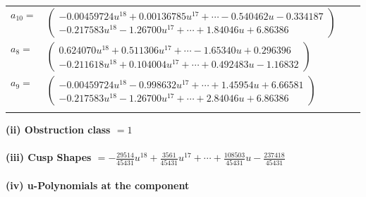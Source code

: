 \documentclass[1p]{elsarticle_modified}
\theoremstyle{definition}
\begin{document}
\begin{tabular}{m{7pt} m{180pt} m{7pt} m{180pt} }
\flushright $a_{10}=$&$\begin{pmatrix}-0.00459724 u^{18}+0.00136785 u^{17}+\cdots-0.540462 u-0.334187\\-0.217583 u^{18}-1.26700 u^{17}+\cdots+1.84046 u+6.86386\end{pmatrix}$ \\
\flushright $a_{8}=$&$\begin{pmatrix}0.624070 u^{18}+0.511306 u^{17}+\cdots-1.65340 u+0.296396\\-0.211618 u^{18}+0.104004 u^{17}+\cdots+0.492483 u-1.16832\end{pmatrix}$ \\
\flushright $a_{9}=$&$\begin{pmatrix}-0.00459724 u^{18}-0.998632 u^{17}+\cdots+1.45954 u+6.66581\\-0.217583 u^{18}-1.26700 u^{17}+\cdots+2.84046 u+6.86386\end{pmatrix}$\\&\end{tabular}
\flushleft \textbf{(ii) Obstruction class $= 1$}\\~\\
\flushleft \textbf{(iii) Cusp Shapes $= -\frac{29514}{45431} u^{18}+\frac{3561}{45431} u^{17}+\cdots+\frac{108503}{45431} u-\frac{237418}{45431}$}\\~\\
\newpage\renewcommand{\arraystretch}{1}
\flushleft \textbf{(iv) u-Polynomials at the component}\newline \\
\end{document}

